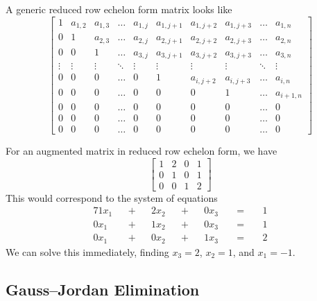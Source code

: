 \begin{example}
  A generic reduced row echelon form matrix looks like
  \begin{equation}
\begin{bmatrix}
1 & a_{1,2} & a_{1,3} & \dots & a_{1,j} & a_{1,j+1} & a_{1,j+2} & a_{1,j+3} & \dots& a_{1,n}\\
0 & 1 & a_{2,3} & \dots & a_{2,j} & a_{2,j+1} & a_{2,j+2} & a_{2,j+3} & \dots& a_{2,n}\\
0 & 0 & 1 & \dots & a_{3,j} & a_{3,j+1} & a_{3,j+2} & a_{3,j+3} & \dots& a_{3,n}\\
\vdots & \vdots & \vdots & \ddots & \vdots & \vdots & \vdots & \vdots & \ddots & \vdots\\
0 & 0 & 0 & \dots & 0 & 1 & a_{i,j+2} & a_{i,j+3} & \dots & a_{i,n}\\
0 & 0 & 0 & \dots & 0 & 0 & 0        & 1        & \dots & a_{i+1,n}\\ 
0 & 0 & 0 & \dots & 0 & 0 & 0 & 0 & \dots & 0\\
0 & 0 & 0 & \dots & 0 & 0 & 0 & 0 & \dots & 0\\
0 & 0 & 0 & \dots & 0 & 0 & 0 & 0 & \dots & 0
\end{bmatrix}
  \end{equation}
\end{example}

\begin{example}
  For an augmented matrix in reduced row echelon form, we have
  \begin{equation}
\left[\begin{array}{ccc|c}
1 & 2 & 0 & 1\\
0 & 1 & 0 & 1\\
0 & 0 & 1 & 2
  \end{array}\right]  
  \end{equation}
  This would correspond to the system of equations
\begin{alignat*}{7}
1x_{1} && + && 2x_{2} && + && 0x_{3} &&\;=\;&&1\\
0x_{1} && + && 1x_{2} && + && 0x_{3} &&\;=\;&&1\\
0x_{1} && + && 0x_{2} && + && 1x_{3} &&\;=\;&&2
\end{alignat*}
We can solve this immediately, finding $x_{3}=2$, $x_{2}=1$, and $x_{1}=-1$.
\end{example}

\subsection{Gauss--Jordan Elimination}

